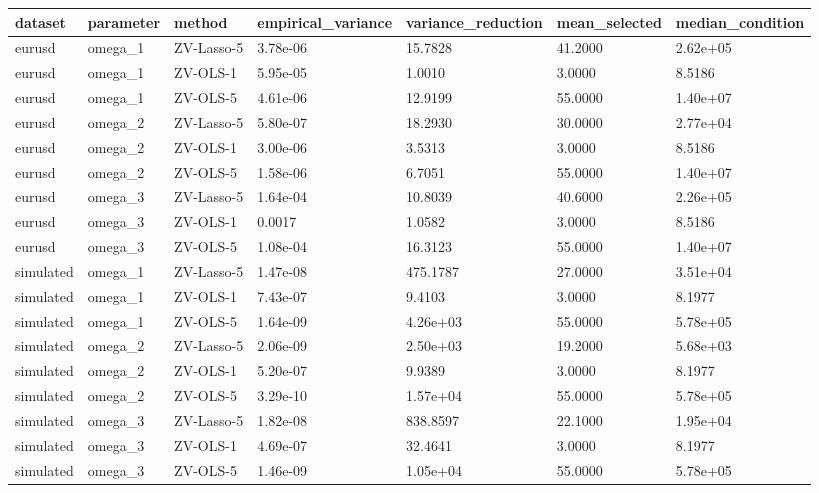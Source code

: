 \begin{tabular}{lllllll}
\toprule
dataset & parameter & method & empirical\_variance & variance\_reduction & mean\_selected & median\_condition \\
\midrule
eurusd & omega\_1 & ZV-Lasso-5 & 3.78e-06 & 15.7828 & 41.2000 & 2.62e+05 \\
eurusd & omega\_1 & ZV-OLS-1 & 5.95e-05 & 1.0010 & 3.0000 & 8.5186 \\
eurusd & omega\_1 & ZV-OLS-5 & 4.61e-06 & 12.9199 & 55.0000 & 1.40e+07 \\
eurusd & omega\_2 & ZV-Lasso-5 & 5.80e-07 & 18.2930 & 30.0000 & 2.77e+04 \\
eurusd & omega\_2 & ZV-OLS-1 & 3.00e-06 & 3.5313 & 3.0000 & 8.5186 \\
eurusd & omega\_2 & ZV-OLS-5 & 1.58e-06 & 6.7051 & 55.0000 & 1.40e+07 \\
eurusd & omega\_3 & ZV-Lasso-5 & 1.64e-04 & 10.8039 & 40.6000 & 2.26e+05 \\
eurusd & omega\_3 & ZV-OLS-1 & 0.0017 & 1.0582 & 3.0000 & 8.5186 \\
eurusd & omega\_3 & ZV-OLS-5 & 1.08e-04 & 16.3123 & 55.0000 & 1.40e+07 \\
simulated & omega\_1 & ZV-Lasso-5 & 1.47e-08 & 475.1787 & 27.0000 & 3.51e+04 \\
simulated & omega\_1 & ZV-OLS-1 & 7.43e-07 & 9.4103 & 3.0000 & 8.1977 \\
simulated & omega\_1 & ZV-OLS-5 & 1.64e-09 & 4.26e+03 & 55.0000 & 5.78e+05 \\
simulated & omega\_2 & ZV-Lasso-5 & 2.06e-09 & 2.50e+03 & 19.2000 & 5.68e+03 \\
simulated & omega\_2 & ZV-OLS-1 & 5.20e-07 & 9.9389 & 3.0000 & 8.1977 \\
simulated & omega\_2 & ZV-OLS-5 & 3.29e-10 & 1.57e+04 & 55.0000 & 5.78e+05 \\
simulated & omega\_3 & ZV-Lasso-5 & 1.82e-08 & 838.8597 & 22.1000 & 1.95e+04 \\
simulated & omega\_3 & ZV-OLS-1 & 4.69e-07 & 32.4641 & 3.0000 & 8.1977 \\
simulated & omega\_3 & ZV-OLS-5 & 1.46e-09 & 1.05e+04 & 55.0000 & 5.78e+05 \\
\bottomrule
\end{tabular}
